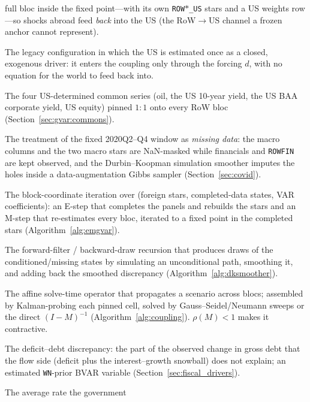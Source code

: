\documentclass[11pt]{article}
\theoremstyle{definition}
\theoremstyle{remark}
\begin{document}
\begin{description}[leftmargin=0pt,labelindent=0pt,style=nextline,itemsep=3pt]
    full bloc inside the fixed point---with its own \texttt{ROW$*$\_US}
    stars and a US weights row---so shocks abroad feed \emph{back} into the
    US (the RoW$\to$US channel a frozen anchor cannot represent).
  \item[Frozen anchor] The legacy configuration in which the US is
    estimated once as a closed, exogenous driver: it enters the coupling
    only through the forcing $d$, with no equation for the world to feed
    back into.
  \item[Global commons] The four US-determined common series (oil, the US
    10-year yield, the US BAA corporate yield, US equity) pinned $1{:}1$
    onto every RoW bloc (Section~\ref{sec:gvar:commons}).
  \item[COVID-as-missing] The treatment of the fixed 2020Q2--Q4 window as
    \emph{missing data}: the macro columns and the two macro stars are
    NaN-masked while financials and \texttt{ROWFIN} are kept observed, and
    the Durbin--Koopman simulation smoother imputes the holes inside a
    data-augmentation Gibbs sampler (Section~\ref{sec:covid}).
  \item[EM loop] The block-coordinate iteration over (foreign stars,
    completed-data states, VAR coefficients): an E-step that completes the
    panels and rebuilds the stars and an M-step that re-estimates every
    bloc, iterated to a fixed point in the completed stars
    (Algorithm~\ref{alg:emgvar}).
  \item[Durbin--Koopman simulation smoother] The forward-filter /
    backward-draw recursion \citep{DurbinKoopman2002} that produces draws
    of the conditioned/missing states by simulating an unconditional path,
    smoothing it, and adding back the smoothed discrepancy
    (Algorithm~\ref{alg:dksmoother}).
  \item[Coupling operator $M$, fixed point $x=Mx+d$] The affine solve-time
    operator that propagates a scenario across blocs; assembled by
    Kalman-probing each pinned cell, solved by Gauss--Seidel/Neumann sweeps
    or the direct $(I-M)^{-1}$ (Algorithm~\ref{alg:coupling}). $\rho(M)<1$
    makes it contractive.
  \item[SFA (stock-flow adjustment)] The deficit--debt discrepancy: the
    part of the observed change in gross debt that the flow side (deficit
    plus the interest--growth snowball) does not explain; an estimated
    \texttt{WN}-prior BVAR variable (Section~\ref{sec:fiscal_drivers}).
  \item[EFFI (effective interest rate)] The average rate the government

\end{description}
\end{document}
